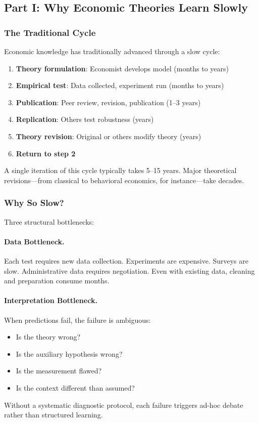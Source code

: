 \subsection{Part I: Why Economic Theories Learn Slowly}

\subsubsection{The Traditional Cycle}

Economic knowledge has traditionally advanced through a slow cycle:

\begin{enumerate}
    \item \textbf{Theory formulation}: Economist develops model (months to years)
    \item \textbf{Empirical test}: Data collected, experiment run (months to years)
    \item \textbf{Publication}: Peer review, revision, publication (1--3 years)
    \item \textbf{Replication}: Others test robustness (years)
    \item \textbf{Theory revision}: Original or others modify theory (years)
    \item \textbf{Return to step 2}
\end{enumerate}

A single iteration of this cycle typically takes 5--15 years. Major theoretical 
revisions---from classical to behavioral economics, for instance---take decades.

\subsubsection{Why So Slow?}

Three structural bottlenecks:

\paragraph{Data Bottleneck.}
Each test requires new data collection. Experiments are expensive. Surveys are 
slow. Administrative data requires negotiation. Even with existing data, 
cleaning and preparation consume months.

\paragraph{Interpretation Bottleneck.}
When predictions fail, the failure is ambiguous:
\begin{itemize}
    \item Is the theory wrong?
    \item Is the auxiliary hypothesis wrong?
    \item Is the measurement flawed?
    \item Is the context different than assumed?
\end{itemize}
Without a systematic diagnostic protocol, each failure triggers ad-hoc debate 
rather than structured learning.

